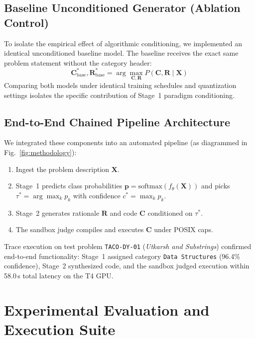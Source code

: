 \documentclass[journal]{IEEEtran}
\begin{document}
\subsection{Baseline Unconditioned Generator (Ablation Control)}
To isolate the empirical effect of algorithmic conditioning, we implemented an identical unconditioned baseline model. The baseline receives the exact same problem statement without the category header:
\begin{equation}
\mathbf{C}_\text{base}^*, \mathbf{R}_\text{base}^* = \arg\max_{\mathbf{C}, \mathbf{R}} P(\mathbf{C}, \mathbf{R} \mid \mathbf{X})
\end{equation}
Comparing both models under identical training schedules and quantization settings isolates the specific contribution of Stage~1 paradigm conditioning.

\subsection{End-to-End Chained Pipeline Architecture}
We integrated these components into an automated pipeline (as diagrammed in Fig.~\ref{fig:methodology}):
\begin{enumerate}
    \item Ingest the problem description $\mathbf{X}$.
    \item Stage~1 predicts class probabilities $\mathbf{p} = \text{softmax}(f_\theta(\mathbf{X}))$ and picks $\tau^* = \arg\max_k p_k$ with confidence $c^* = \max_k p_k$.
    \item Stage~2 generates rationale $\mathbf{R}$ and code $\mathbf{C}$ conditioned on $\tau^*$.
    \item The sandbox judge compiles and executes $\mathbf{C}$ under POSIX caps.
\end{enumerate}

Trace execution on test problem \texttt{TACO-DY-01} (\textit{Utkarsh and Substrings}) confirmed end-to-end functionality: Stage~1 assigned category \texttt{Data Structures} (96.4\% confidence), Stage~2 synthesized code, and the sandbox judged execution within 58.0\,s total latency on the T4 GPU.

\section{Experimental Evaluation and Execution Suite}
\end{document}
